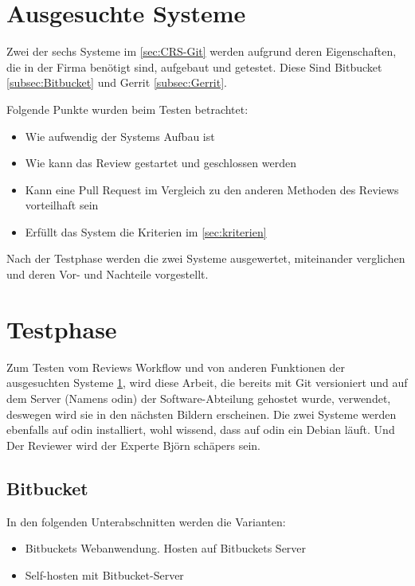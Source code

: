 \section{Ausgesuchte Systeme}
\label{sec:Ausgesuchte Systeme}

Zwei der sechs Systeme im \cref{sec:CRS-Git} werden aufgrund deren Eigenschaften, die in der Firma benötigt sind, aufgebaut und getestet. Diese Sind Bitbucket \cref{subsec:Bitbucket} und Gerrit \cref{subsec:Gerrit}.

Folgende Punkte wurden beim Testen betrachtet:

\begin{itemize}
	\item Wie aufwendig der Systems Aufbau ist
	\item Wie kann das Review gestartet und geschlossen werden
	\item Kann eine Pull Request im Vergleich zu den anderen Methoden des Reviews vorteilhaft sein
	\item Erfüllt das System die Kriterien im \cref{sec:kriterien}
\end{itemize}

Nach der Testphase werden die zwei Systeme ausgewertet, miteinander verglichen und deren Vor- und Nachteile vorgestellt.

\section{Testphase}
\label{sec:testphase}

Zum Testen vom Reviews Workflow und von anderen Funktionen der ausgesuchten Systeme \cref{sec:Ausgesuchte Systeme}, wird diese Arbeit, die bereits mit Git versioniert und auf dem Server (Namens odin) der Software-Abteilung gehostet wurde, verwendet, deswegen wird sie in den nächsten Bildern erscheinen.  Die zwei Systeme werden ebenfalls auf odin installiert, wohl wissend, dass auf odin ein Debian läuft. Und Der Reviewer wird der Experte Björn schäpers \cite{Bjoern} sein.

\subsection{Bitbucket}
\label{subsec:Test_Bitbucket}

In den folgenden Unterabschnitten werden die Varianten:
\begin{itemize}
	\item Bitbuckets Webanwendung. Hosten auf Bitbuckets Server
	\item Self-hosten mit Bitbucket-Server
\end{itemize}

